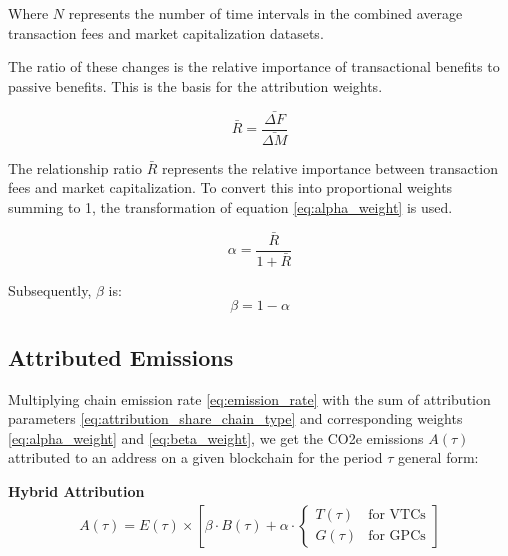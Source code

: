 \documentclass[11pt]{report}
\begin{document}
Where \( N \) represents the number of time intervals in the combined average transaction fees and market capitalization datasets.

The ratio of these changes is the relative importance of transactional benefits to passive benefits. This is the basis for the attribution weights.

\begin{equation} \label{eq:weights_ratio}
    \bar{R} = \frac{\bar{\Delta F}}{\bar{\Delta M}}
\end{equation}

The relationship ratio $\bar{R}$ represents the relative importance between transaction fees and market capitalization. To convert this into proportional weights summing to 1, the transformation of equation \eqref{eq:alpha_weight} is used.

\begin{equation} \label{eq:alpha_weight}
    \alpha = \frac{\bar{R}}{1 + \bar{R}}
\end{equation}

Subsequently, \( \beta \) is:
\begin{equation} \label{eq:beta_weight}
    \beta = 1 - \alpha
\end{equation}


\subsection{Attributed Emissions \label{se:attributed_emissions}}

Multiplying chain emission rate \eqref{eq:emission_rate} with the sum of attribution parameters \eqref{eq:attribution_share_chain_type} and corresponding weights \eqref{eq:alpha_weight} and \eqref{eq:beta_weight}, we get the CO2e emissions \(A(\tau)\) attributed to an address on a given blockchain for the period $\tau$ general form:

\textbf{Hybrid Attribution}
\begin{align}
    A(\tau) = E(\tau) \times \left[\beta \cdot B(\tau) + \alpha \cdot \begin{cases}
                                                                              T(\tau) & \text{for VTCs} \\
                                                                              G(\tau) & \text{for GPCs}
                                                                          \end{cases}\right]
\end{align}
\end{document}
